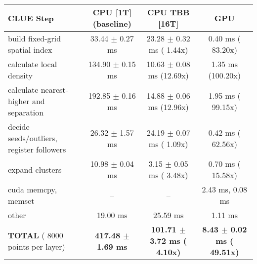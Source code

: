     \begin{tabular}{l|c|c|c}
    \hline
    CLUE Step                                 & CPU [1T] (baseline)         & CPU TBB [16T]                         & GPU                       \\ \hline
    build fixed-grid spatial index            &  33.44 $\pm$  0.27 ms       &  23.28 $\pm$  0.32 ms ( 1.44x)        &   0.40 ms ( 83.20x)       \\
    calculate local density                   & 134.90 $\pm$  0.15 ms       &  10.63 $\pm$  0.08 ms (12.69x)        &   1.35 ms (100.20x)       \\
    calculate nearest-higher and separation   & 192.85 $\pm$  0.16 ms       &  14.88 $\pm$  0.06 ms (12.96x)        &   1.95 ms ( 99.15x)       \\
    decide seeds/outliers, register followers &  26.32 $\pm$  1.57 ms       &  24.19 $\pm$  0.07 ms ( 1.09x)        &   0.42 ms ( 62.56x)       \\
    expand clusters                           &  10.98 $\pm$  0.04 ms       &   3.15 $\pm$  0.05 ms ( 3.48x)        &   0.70 ms ( 15.58x)       \\ \hline
    cuda memcpy, memset                       & --                          & --                                    &   2.43 ms,   0.08 ms      \\ 
    other                                     &  19.00 ms                   &  25.59 ms                             &   1.11 ms                 \\ \hline
    \textbf{TOTAL} ( 8000 points per layer)   & \textbf{417.48 $\pm$  1.69 ms} & \textbf{101.71 $\pm$  3.72 ms ( 4.10x)} & \textbf{  8.43 $\pm$  0.02 ms ( 49.51x)}  \\
    \hline 
    \end{tabular}
    \linebreak


